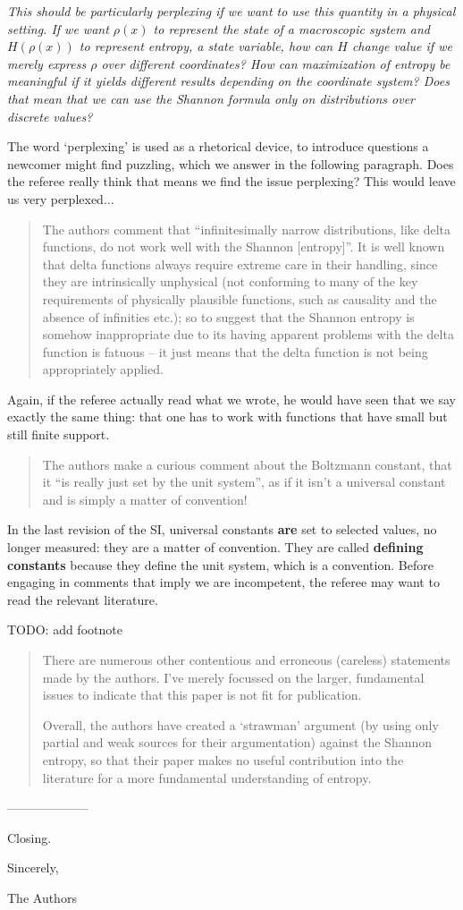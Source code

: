 \documentclass[11pt]{article}
\begin{document}
\emph{	This should be particularly perplexing if we want to use this quantity in a physical setting. If we want $\rho(x)$ to represent the state of a macroscopic system and $H(\rho(x))$ to represent entropy, a state variable, how can $H$ change value if we merely express $\rho$ over different coordinates? How can maximization of entropy be meaningful if it yields different results depending on the coordinate system? Does that mean that we can use the Shannon formula only on distributions over discrete values?}

The word `perplexing' is used as a rhetorical device, to introduce questions a newcomer might find puzzling, which we answer in the following paragraph. Does the referee really think that means we find the issue perplexing? This would leave us very perplexed...

\begin{quote}
The authors comment that “infinitesimally narrow distributions, like delta functions, do not work well with the Shannon [entropy]”. It is well known that delta functions always require extreme care in their handling, since they are intrinsically unphysical (not conforming to many of the key requirements of physically plausible functions, such as causality and the absence of infinities etc.); so to suggest that the Shannon entropy is somehow inappropriate due to its having apparent problems with the delta function is fatuous – it just means that the delta function is not being appropriately applied. 
\end{quote}
Again, if the referee actually read what we wrote, he would have seen that we say exactly the same thing: that one has to work with functions that have small but still finite support.

\begin{quote}
The authors make a curious comment about the Boltzmann constant, that it “is really just set by the unit system”, as if it isn’t a universal constant and is simply a matter of convention! 
\end{quote}
In the last revision of the SI, universal constants \textbf{are} set to selected values, no longer measured: they are a matter of convention. They are called \textbf{defining constants} because they define the unit system, which is a convention. Before engaging in comments that imply we are incompetent, the referee may want to read the relevant literature.

TODO: add footnote

\begin{quote}
There are numerous other contentious and erroneous (careless) statements made by the authors. I’ve merely focussed on the larger, fundamental issues to indicate that this paper is not fit for publication. 

Overall, the authors have created a ‘strawman’ argument (by using only partial and weak sources for their argumentation) against the Shannon entropy, so that their paper makes no useful contribution into the literature for a more fundamental understanding of entropy.
\end{quote}




--------------------


Closing.

Sincerely,

The Authors
\end{document}
